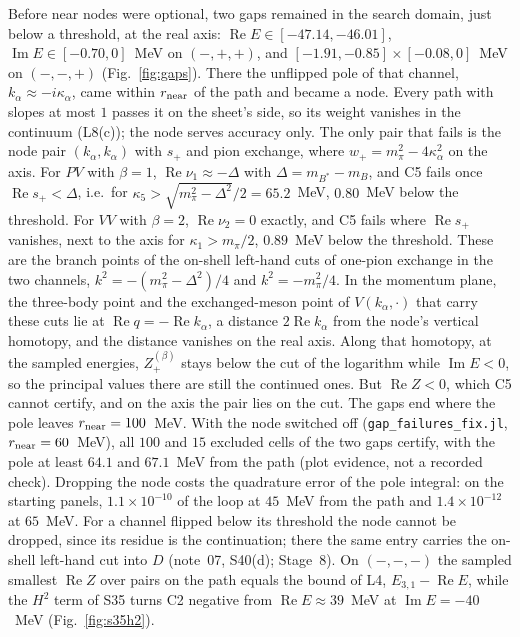 \documentclass[11pt]{article}
\newcommand{\file}[1]{\nolinkurl{#1}}
\begin{document}
Before near nodes were optional, two gaps remained in the search domain, just below a threshold, at the real axis: $\operatorname{Re}E\in[-47.14,-46.01]$, $\operatorname{Im}E\in[-0.70,0]$~MeV on $(-,+,+)$, and $[-1.91,-0.85]\times[-0.08,0]$~MeV on $(-,-,+)$ (Fig.~\ref{fig:gaps}). There the unflipped pole of that channel, $k_\alpha\approx-i\kappa_\alpha$, came within $r_{\rm near}$ of the path and became a node. Every path with slopes at most $1$ passes it on the sheet's side, so its weight vanishes in the continuum (L8(c)); the node serves accuracy only. The only pair that fails is the node pair $(k_\alpha,k_\alpha)$ with $s_+$ and pion exchange, where $w_+=m_\pi^2-4\kappa_\alpha^2$ on the axis. For $PV$ with $\beta=1$, $\operatorname{Re}\nu_1\approx-\Delta$ with $\Delta=m_{B^*}-m_B$, and C5 fails once $\operatorname{Re}s_+<\Delta$, i.e.\ for $\kappa_5>\sqrt{m_\pi^2-\Delta^2}/2=65.2$~MeV, $0.80$~MeV below the threshold. For $VV$ with $\beta=2$, $\operatorname{Re}\nu_2=0$ exactly, and C5 fails where $\operatorname{Re}s_+$ vanishes, next to the axis for $\kappa_1>m_\pi/2$, $0.89$~MeV below the threshold. These are the branch points of the on-shell left-hand cuts of one-pion exchange in the two channels, $k^2=-(m_\pi^2-\Delta^2)/4$ and $k^2=-m_\pi^2/4$. In the momentum plane, the three-body point and the exchanged-meson point of $V(k_\alpha,\cdot)$ that carry these cuts lie at $\operatorname{Re}q=-\operatorname{Re}k_\alpha$, a distance $2\operatorname{Re}k_\alpha$ from the node's vertical homotopy, and the distance vanishes on the real axis. Along that homotopy, at the sampled energies, $Z^{(\beta)}_+$ stays below the cut of the logarithm while $\operatorname{Im}E<0$, so the principal values there are still the continued ones. But $\operatorname{Re}Z<0$, which C5 cannot certify, and on the axis the pair lies on the cut. The gaps end where the pole leaves $r_{\rm near}=100$~MeV. With the node switched off (\file{gap_failures_fix.jl}, $r_{\rm near}=60$~MeV), all $100$ and $15$ excluded cells of the two gaps certify, with the pole at least $64.1$ and $67.1$~MeV from the path (plot evidence, not a recorded check). Dropping the node costs the quadrature error of the pole integral: on the starting panels, $1.1\times10^{-10}$ of the loop at $45$~MeV from the path and $1.4\times10^{-12}$ at $65$~MeV. For a channel flipped below its threshold the node cannot be dropped, since its residue is the continuation; there the same entry carries the on-shell left-hand cut into $D$ (note~07, S40(d); Stage~8). On $(-,-,-)$ the sampled smallest $\operatorname{Re}Z$ over pairs on the path equals the bound of L4, $E_{3,1}-\operatorname{Re}E$, while the $H^2$ term of S35 turns C2 negative from $\operatorname{Re}E\approx39$~MeV at $\operatorname{Im}E=-40$~MeV (Fig.~\ref{fig:s35h2}).
\end{document}
